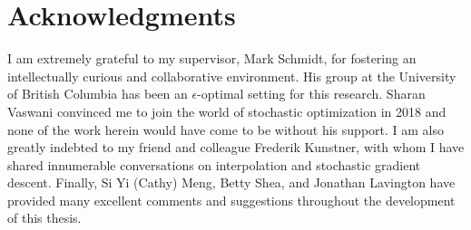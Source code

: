 
\chapter{Acknowledgments}

I am extremely grateful to my supervisor, Mark Schmidt, for fostering an intellectually curious and collaborative environment.
His group at the University of British Columbia has been an \( \epsilon \)-optimal setting for this research.
Sharan Vaswani convinced me to join the world of stochastic optimization in 2018 and none of the work herein would have come to be without his support.
I am also greatly indebted to my friend and colleague Frederik Kunstner, with whom I have shared innumerable conversations on interpolation and stochastic gradient descent. 
Finally, Si Yi (Cathy) Meng, Betty Shea, and Jonathan Lavington have provided many excellent comments and suggestions throughout the development of this thesis. 

